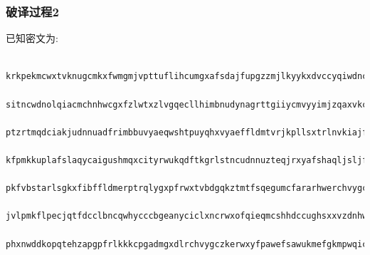     \subsubsection{破译过程2}
        已知密文为:\\
        \begin{lstlisting}
            krkpekmcwxtvknugcmkxfwmgmjvpttuflihcumgxafsdajfupgzzmjlkyykxdvccyqiwdncebwhyjmgkazybtdf
            sitncwdnolqiacmchnhwcgxfzlwtxzlvgqecllhimbnudynagrttgiiycmvyyimjzqaxvkcgkgrawxupmjwqemi
            ptzrtmqdciakjudnnuadfrimbbuvyaeqwshtpuyqhxvyaeffldmtvrjkpllsxtrlnvkiajfukycvgjgibubldpp
            kfpmkkuplafslaqycaigushmqxcityrwukqdftkgrlstncudnnuzteqjrxyafshaqljsljfunhwiqtehncpkgxs
            pkfvbstarlsgkxfibffldmerptrqlygxpfrwxtvbdgqkztmtfsqegumcfararhwerchvygczyzjaacgntgvfktm
            jvlpmkflpecjqtfdcclbncqwhycccbgeanyciclxncrwxofqieqmcshhdccughsxxvzdnhwtycmcbcrttvmurql
            phxnwddkopqtehzapgpfrlkkkcpgadmgxdlrchvygczkerwxyfpawefsawukmefgkmpwqicnhwlnihvycsxckf
        \end{lstlisting}

